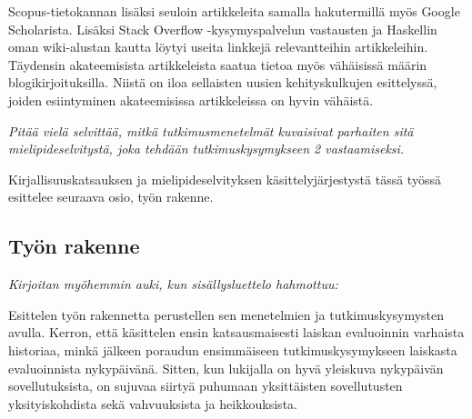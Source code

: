 Scopus-tietokannan lisäksi seuloin artikkeleita samalla hakutermillä myös Google Scholarista. Lisäksi Stack Overflow -kysymyspalvelun vastausten ja Haskellin oman wiki-alustan kautta löytyi useita linkkejä relevantteihin artikkeleihin. Täydensin akateemisista artikkeleista saatua tietoa myös vähäisissä määrin blogikirjoituksilla. Niistä on iloa sellaisten uusien kehityskulkujen esittelyssä, joiden esiintyminen akateemisissa artikkeleissa on hyvin vähäistä.

\textit{Pitää vielä selvittää, mitkä tutkimusmenetelmät kuvaisivat parhaiten sitä mielipideselvitystä, joka tehdään tutkimuskysymykseen 2 vastaamiseksi.}

Kirjallisuuskatsauksen ja mielipideselvityksen käsittelyjärjestystä tässä työssä esittelee seuraava osio, työn rakenne.

\subsection{Työn rakenne}

\textit{Kirjoitan myöhemmin auki, kun sisällysluettelo hahmottuu:}

Esittelen työn rakennetta perustellen sen menetelmien ja tutkimuskysymysten avulla. Kerron, että käsittelen ensin katsausmaisesti laiskan evaluoinnin varhaista historiaa, minkä jälkeen poraudun ensimmäiseen tutkimuskysymykseen laiskasta evaluoinnista nykypäivänä. Sitten, kun lukijalla on hyvä yleiskuva nykypäivän sovellutuksista, on sujuvaa siirtyä puhumaan yksittäisten sovellutusten yksityiskohdista sekä vahvuuksista ja heikkouksista.



